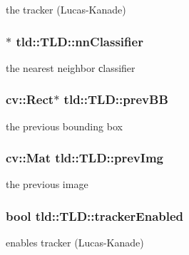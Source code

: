 the tracker (Lucas-\/\-Kanade) 

\hypertarget{classtld_1_1TLD_a98a1be08a4b630d85e5e60dc4bb78b13}{
\subsubsection[{nn\-Classifier}]{$\ast$ tld\-::\-T\-L\-D\-::nn\-Classifier}}\label{classtld_1_1TLD_a98a1be08a4b630d85e5e60dc4bb78b13}


the nearest neighbor сlassifier 

\hypertarget{classtld_1_1TLD_adc7a217f04d600daffe8d025f424677f}{
\subsubsection[{prev\-B\-B}]{\setlength{\rightskip}{0pt plus 5cm}cv\-::\-Rect$\ast$ tld\-::\-T\-L\-D\-::prev\-B\-B}}\label{classtld_1_1TLD_adc7a217f04d600daffe8d025f424677f}


the previous bounding box 

\hypertarget{classtld_1_1TLD_a7b402ff7a0260f00b8d3dbcea5c87efa}{
\subsubsection[{prev\-Img}]{\setlength{\rightskip}{0pt plus 5cm}cv\-::\-Mat tld\-::\-T\-L\-D\-::prev\-Img}}\label{classtld_1_1TLD_a7b402ff7a0260f00b8d3dbcea5c87efa}


the previous image 

\hypertarget{classtld_1_1TLD_ab94fab1f55f6ef122c9e3fcf4747ac50}{
\subsubsection[{tracker\-Enabled}]{\setlength{\rightskip}{0pt plus 5cm}bool tld\-::\-T\-L\-D\-::tracker\-Enabled}}\label{classtld_1_1TLD_ab94fab1f55f6ef122c9e3fcf4747ac50}


enables tracker (Lucas-\/\-Kanade) 

